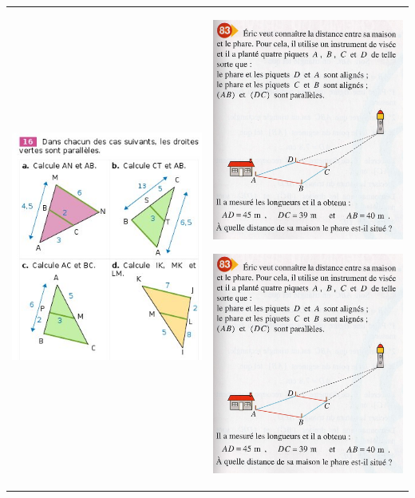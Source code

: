 \documentclass[12pt, twoside]{article}
\begin{document}
\begin{tabular}{cc}
\begin{minipage}{9cm}
\includegraphics[width=7cm]{images/ex16.jpg}
\end{minipage}
&
\begin{minipage}{9cm}
\includegraphics[width=7cm]{images/ex83.jpg}



\enskip

\includegraphics[width=7cm]{images/ex83.jpg}


\end{minipage}
\end{tabular}
\end{document}
